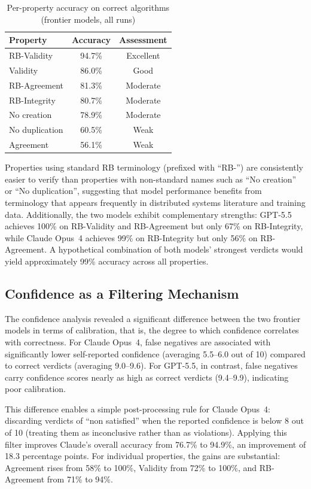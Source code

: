 \begin{table}[H]
\centering
\renewcommand{\arraystretch}{1.3}
\caption{Per-property accuracy on correct algorithms (frontier models, all runs)}
\label{tab:property-ranking}
\begin{tabular}{|l|c|c|}
\hline
\textbf{Property} & \textbf{Accuracy} & \textbf{Assessment} \\
\hline
RB-Validity & 94.7\% & Excellent \\
Validity & 86.0\% & Good \\
RB-Agreement & 81.3\% & Moderate \\
RB-Integrity & 80.7\% & Moderate \\
No creation & 78.9\% & Moderate \\
No duplication & 60.5\% & Weak \\
Agreement & 56.1\% & Weak \\
\hline
\end{tabular}
\end{table}

Properties using standard RB terminology (prefixed with ``RB-'') are consistently easier to verify than properties with non-standard names such as ``No creation'' or ``No duplication'', suggesting that model performance benefits from terminology that appears frequently in distributed systems literature and training data. Additionally, the two models exhibit complementary strengths: GPT-5.5 achieves 100\% on RB-Validity and RB-Agreement but only 67\% on RB-Integrity, while Claude Opus~4 achieves 99\% on RB-Integrity but only 56\% on RB-Agreement. A hypothetical combination of both models' strongest verdicts would yield approximately 99\% accuracy across all properties.

\subsection{Confidence as a Filtering Mechanism}

The confidence analysis revealed a significant difference between the two frontier models in terms of calibration, that is, the degree to which confidence correlates with correctness. For Claude Opus~4, false negatives are associated with significantly lower self-reported confidence (averaging 5.5--6.0 out of 10) compared to correct verdicts (averaging 9.0--9.6). For GPT-5.5, in contrast, false negatives carry confidence scores nearly as high as correct verdicts (9.4--9.9), indicating poor calibration.

This difference enables a simple post-processing rule for Claude Opus~4: discarding verdicts of ``non satisfied'' when the reported confidence is below 8 out of 10 (treating them as inconclusive rather than as violations). Applying this filter improves Claude's overall accuracy from 76.7\% to 94.9\%, an improvement of 18.3 percentage points. For individual properties, the gains are substantial: Agreement rises from 58\% to 100\%, Validity from 72\% to 100\%, and RB-Agreement from 71\% to 94\%.


